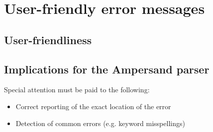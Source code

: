 
\section{User-friendly error messages}
\label{sec:errors}

\subsection{User-friendliness}

\subsection{Implications for the Ampersand parser}
Special attention must be paid to the following:
\begin{itemize}
	\item Correct reporting of the exact location of the error
	\item Detection of common errors (e.g. keyword misspellings)
\end{itemize}